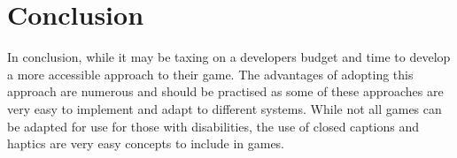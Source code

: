 \documentclass[11pt]{scrartcl}
\begin{document}
\section{Conclusion}

In conclusion, while it may be taxing on a developers budget and time to develop a more accessible approach to their game. The advantages of adopting this approach are numerous and should be practised as some of these approaches are very easy to implement and adapt to different systems. While not all games can be adapted for use for those with disabilities, the use of closed captions and haptics are very easy concepts to include in games.



\end{document}
